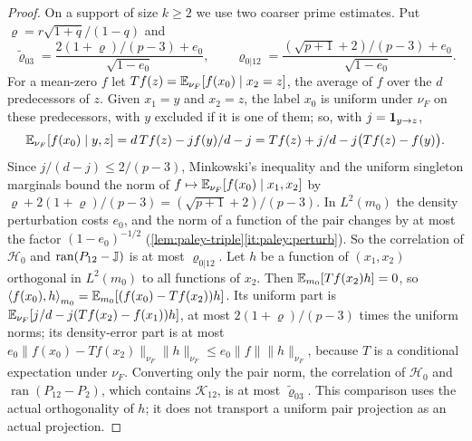 \begin{proof}
On a support of size $k\ge2$ we use two coarser prime estimates. Put
$\varrho=r\sqrt{1+q}/(1-q)$ and
\[
 \tilde\varrho_{03}=\frac{2(1+\varrho)/(p-3)+e_0}{\sqrt{1-e_0}},\qquad
 \varrho_{0|12}=\frac{(\sqrt{p+1}+2)/(p-3)+e_0}{\sqrt{1-e_0}} .
\]
For a mean-zero $f$ let $Tf(z)=\mathbb E_{\nu_F}[f(x_0)\mid x_2=z]$, the average of $f$ over
the $d$ predecessors of $z$. Given $x_1=y$ and $x_2=z$, the label $x_0$ is uniform
under $\nu_F$ on these predecessors, with $y$ excluded if it is one of them; so,
with $j=\mathbf 1_{y\to z}$,
\[
 \mathbb E_{\nu_F}[f(x_0)\mid y,z]=d\,Tf(z)-jf(y)/d-j
 =Tf(z)+j/d-j\bigl(Tf(z)-f(y)\bigr).
\]
Since $j/(d-j)\le2/(p-3)$, Minkowski's inequality and the uniform singleton
marginals bound the norm of $f\mapsto\mathbb E_{\nu_F}[f(x_0)\mid x_1,x_2]$ by
$\varrho+2(1+\varrho)/(p-3)=(\sqrt{p+1}+2)/(p-3)$. In $L^2(m_0)$ the density
perturbation costs $e_0$, and the norm of a function of the pair changes by at
most the factor $(1-e_0)^{-1/2}$ (\cref{lem:paley-triple}\ref{it:paley:perturb}). So the
correlation of $\mathcal H_0$ and $\operatorname{ran}(P_{12}-\mathbb J)$ is at most
$\varrho_{0|12}$. Let $h$ be a function of $(x_1,x_2)$ orthogonal in $L^2(m_0)$ to all
functions of $x_2$. Then $\mathbb E_{m_0}[Tf(x_2)h]=0$, so
$\left\langle f(x_0),h\right\rangle_{m_0}=\mathbb E_{m_0}[(f(x_0)-Tf(x_2))h]$. Its uniform part is
$\mathbb E_{\nu_F}[j/d-j(Tf(x_2)-f(x_1))h]$, at most $2(1+\varrho)/(p-3)$ times the
uniform norms; its density-error part is at most
$e_0\|f(x_0)-Tf(x_2)\|_{\nu_F}\|h\|_{\nu_F}\le e_0\|f\|\|h\|_{\nu_F}$, because $T$ is a
conditional expectation under $\nu_F$. Converting only the pair norm, the
correlation of $\mathcal H_0$ and $\operatorname{ran}(P_{12}-P_2)$, which contains
$\mathcal K_{12}$, is at most $\tilde\varrho_{03}$. This comparison uses the actual
orthogonality of $h$; it does not transport a uniform pair projection as an actual
projection.


\end{proof}
